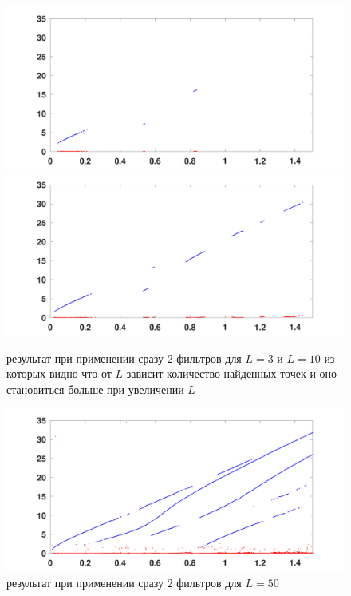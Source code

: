 \documentclass{article}
\begin{document}
	\begin{figure}[!h]
		\begin{center}
			\includegraphics[width=0.5\linewidth]{images/matrix_pencil_method/dx_L_filter_near_L=3.png}\includegraphics[width=0.5\linewidth]{images/matrix_pencil_method/dx_L_filter_near_L=10.png}
			\caption{результат при применении сразу 2 фильтров для $L=3$ и $L=10$ из которых видно что от $L$ зависит количество найденных точек и оно становиться больше при увеличении $L$}
		\end{center}
	\end{figure}
	
	\begin{figure}[!h]
		\begin{center}
			\includegraphics[width=0.9\linewidth]{images/matrix_pencil_method/dx_L_filter_near_L=50.png}
			\caption{результат при применении сразу 2 фильтров для $L=50$}
		\end{center}
	\end{figure}
	
\end{document}
